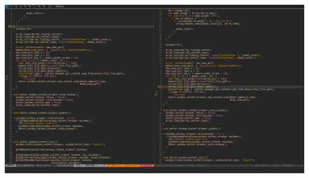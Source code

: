 \documentclass{article}
\begin{document}
  \includegraphics[width=\textwidth]{54.png}
  
\end{document}
